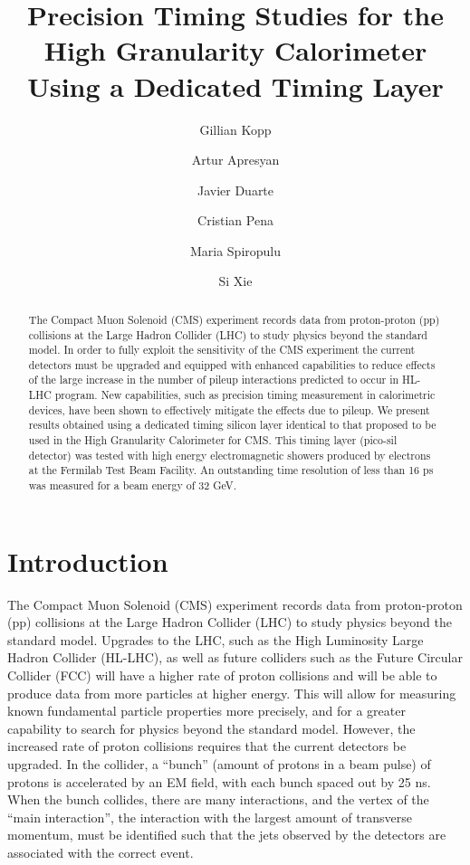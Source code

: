 \documentclass[twocolumn,aps,prd,reprint]{revtex4-1}
\begin{document}
\graphicspath{{GillianKopp/}}

\title{Precision Timing Studies for the High Granularity Calorimeter Using a Dedicated Timing Layer}
\author{Gillian Kopp}
\author{Artur Apresyan}
\author{Javier Duarte}
\author{Cristian Pena}
\author{Maria Spiropulu}
\author{Si Xie}

\begin{abstract}
The Compact Muon Solenoid (CMS) experiment records data from proton-proton (pp) collisions at the Large Hadron Collider (LHC) to study physics beyond the standard model. In order to fully exploit the sensitivity of the CMS experiment the current detectors must be upgraded and equipped with enhanced capabilities to reduce effects of the large increase in the number of pileup interactions predicted to occur in HL-LHC program. New capabilities, such as precision timing measurement in calorimetric devices, have been shown to effectively mitigate the effects due to pileup. We present results obtained using a dedicated timing silicon layer identical to that proposed to be used in the High Granularity Calorimeter for CMS. This timing layer (pico-sil detector) was tested with high energy electromagnetic showers produced by electrons at the Fermilab Test Beam Facility. An outstanding time resolution of less than 16 ps was measured for a beam energy of 32 GeV.
\end{abstract}

\maketitle
\section{Introduction}

The Compact Muon Solenoid (CMS) experiment records data from proton-proton (pp) collisions at the Large Hadron Collider (LHC) to study physics beyond the standard model. Upgrades to the LHC, such as the High Luminosity Large Hadron Collider (HL-LHC), as well as future colliders such as the Future Circular Collider (FCC) will have a higher rate of proton collisions and will be able to produce data from more particles at higher energy. This will allow for measuring known fundamental particle properties more precisely, and for a greater capability to search for physics beyond the standard model. However, the increased rate of proton collisions requires that the current detectors be upgraded. In the collider, a ``bunch'' (amount of protons in a beam pulse) of protons is accelerated by an EM field, with each bunch spaced out by 25 ns. When the bunch collides, there are many interactions, and the vertex of the ``main interaction'', the interaction with the largest amount of transverse momentum, must be identified such that the jets observed by the detectors are associated with the correct event.
\end{document}
